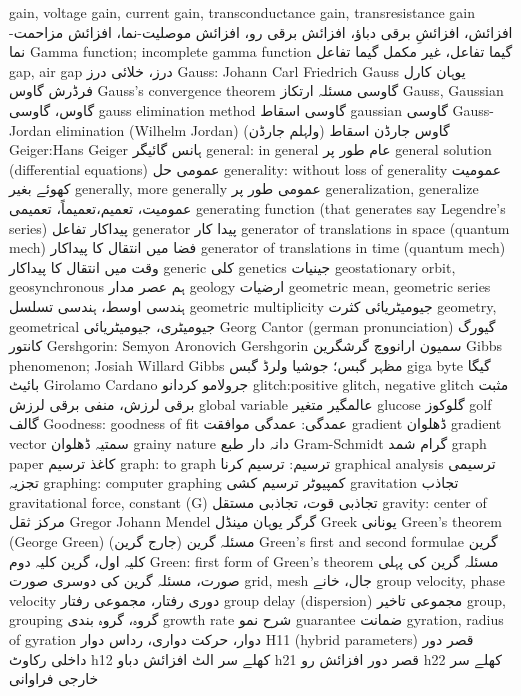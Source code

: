 gain, voltage gain, current gain, transconductance gain, transresistance gain	افزائش، افزائشِ برقی دباؤ، افزائش برقی رو، افزائش موصلیت-نما، افزائش مزاحمت-نما
Gamma function; incomplete gamma function	گیما تفاعل، غیر مکمل گیما تفاعل
gap, air gap	درز، خلائی درز
Gauss: Johann Carl Friedrich Gauss	یوہان کارل فرڈرش گاوس
Gauss's convergence theorem	گاوسی مسئلہ ارتکاز
Gauss, Gaussian	گاوس، گاوسی
gauss elimination method	گاوسی اسقاط
gaussian	گاوسی
Gauss-Jordan elimination (Wilhelm Jordan)	گاوس جارڈن اسقاط (ولہلم جارڈن)
Geiger:Hans Geiger	ہانس گائیگر
general: in general	عام طور پر
general solution (differential equations)	عمومی حل
generality: without loss of generality	عمومیت کھوئے بغیر
generally, more generally	عمومی طور پر
generalization, generalize	عمومیت، تعمیم،تعمیماً، تعمیمی
generating function (that generates say Legendre's series)	پیداکار تفاعل
generator	پیدا کار
generator of translations in space (quantum mech)	فضا میں انتقال کا پیداکار
generator of translations in time (quantum mech)	وقت میں انتقال کا پیداکار
generic	کلی
genetics	جینیات
geostationary orbit, geosynchronous	ہم عصر مدار
geology	ارضیات
geometric mean, geometric series	ہندسی اوسط، ہندسی تسلسل
geometric multiplicity	جیومیٹریائی کثرت
geometry, geometrical	جیومیٹری، جیومیٹریائی
Georg Cantor (german pronunciation)	گیورگ کانتور
Gershgorin: Semyon Aronovich Gershgorin	سمیون ارانووچ گرشگرین
Gibbs phenomenon; Josiah Willard Gibbs	مظہر گبس؛ جوشیا ولرڈ گبس
giga byte	گیگا بائیٹ
Girolamo Cardano	جرولامو کردانو
glitch:positive glitch, negative glitch	مثبت برقی لرزش، منفی برقی لرزش
global variable	عالمگیر متغیر
glucose	گلوکوز
golf	گالف
Goodness: goodness of fit	عمدگی: عمدگی موافقت
gradient	ڈھلوان
gradient vector	سمتیہ ڈھلوان
grainy nature	دانہ دار طبع
Gram-Schmidt	گرام شمد
graph paper	کاغذ ترسیم
graph: to graph	ترسیم: ترسیم کرنا
graphical analysis	ترسیمی تجزیہ
graphing: computer graphing	کمپیوٹر ترسیم کشی
gravitation	تجاذب
gravitational force, constant (G)	تجاذبی قوت، تجاذبی مستقل
gravity: center of	مرکز ثقل
Gregor Johann Mendel	گرگر یوہان مینڈل
Greek	یونانی
Green's theorem (George Green)	مسئلہ گرین (جارج گرین)
Green's first and second formulae	گرین کلیہ اول، گرین کلیہ دوم
Green: first form of Green's theorem	مسئلہ گرین کی پہلی صورت، مسئلہ گرین کی دوسری صورت
grid,  mesh	جال، خانے
group velocity, phase velocity	دوری رفتار، مجموعی رفتار
group delay (dispersion)	مجموعی تاخیر
group, grouping	گروہ، گروہ بندی
growth rate	شرح نمو
guarantee	ضمانت
gyration, radius of gyration	دوار، حرکت دواری، رداس دوار
H11 (hybrid parameters)	قصر دور داخلی رکاوٹ
h12	کھلے سر الٹ افزائش دباو
h21	قصر دور افزائش رو
h22	کھلے سر خارجی فراوانی

